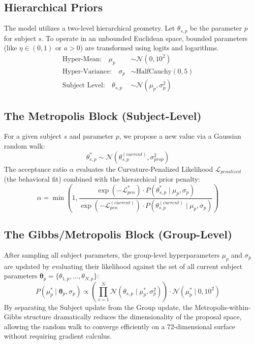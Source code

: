 \documentclass[11pt,a4paper]{article}
\begin{document}
\subsection{Hierarchical Priors}
The model utilizes a two-level hierarchical geometry.
Let $\theta_{s, p}$ be the parameter $p$ for subject $s$. To operate in an unbounded Euclidean space, bounded parameters (like $\eta \in (0,1)$ or $a > 0$) are transformed using logits and logarithms.
\begin{align}
    \text{Hyper-Mean:} \quad \mu_p &\sim \mathcal{N}(0, 10^2) \\
    \text{Hyper-Variance:} \quad \sigma_p &\sim \text{HalfCauchy}(0, 5) \\
    \text{Subject Level:} \quad \theta_{s, p} &\sim \mathcal{N}(\mu_p, \sigma_p^2)
\end{align}

\subsection{The Metropolis Block (Subject-Level)}
For a given subject $s$ and parameter $p$, we propose a new value via a Gaussian random walk:
\begin{equation}
    \theta_{s,p}^* \sim \mathcal{N}(\theta_{s,p}^{(current)}, \sigma_{prop}^2)
\end{equation}
The acceptance ratio $\alpha$ evaluates the Curvature-Penalized Likelihood $\mathcal{L}_{penalized}$ (the behavioral fit) combined with the hierarchical prior penalty:
\begin{equation}
    \alpha = \min \left( 1, \frac{ \exp(-\mathcal{L}_{pen}^* ) \cdot P(\theta_{s,p}^* \mid \mu_p, \sigma_p) }{ \exp(-\mathcal{L}_{pen}^{(current)} ) \cdot P(\theta_{s,p}^{(current)} \mid \mu_p, \sigma_p) } \right)
\end{equation}

\subsection{The Gibbs/Metropolis Block (Group-Level)}
After sampling all subject parameters, the group-level hyperparameters $\mu_p$ and $\sigma_p$ are updated by evaluating their likelihood against the set of all current subject parameters $\boldsymbol{\theta}_p = \{\theta_{1,p}, \dots, \theta_{N,p}\}$:
\begin{equation}
    P(\mu_p^* \mid \boldsymbol{\theta}_p, \sigma_p) \propto \left( \prod_{s=1}^N \mathcal{N}(\theta_{s,p} \mid \mu_p^*, \sigma_p^2) \right) \cdot \mathcal{N}(\mu_p^* \mid 0, 10^2)
\end{equation}
By separating the Subject update from the Group update, the Metropolis-within-Gibbs structure dramatically reduces the dimensionality of the proposal space, allowing the random walk to converge efficiently on a 72-dimensional surface without requiring gradient calculus.
\end{document}
